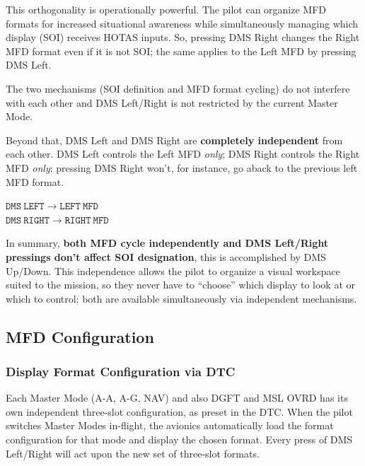 \documentclass[11pt, a4paper, twoside]{report}
\begin{document}
This orthogonality is operationally powerful. The pilot can organize MFD formats for increased situational awareness while simultaneously managing which display (SOI) receives HOTAS inputs. So, pressing DMS Right changes the Right MFD format even if it is not SOI; the same applies to the Left MFD by pressing DMS Left.

The two mechanisms (SOI definition and MFD format cycling) do not interfere with each other and DMS Left/Right is not restricted by the current Master Mode.

Beyond that, DMS Left and DMS Right are \textbf{completely independent} from each other. DMS Left controls the Left MFD \textit{only}; DMS Right controls the Right MFD \textit{only}: pressing DMS Right won't, for instance, go aback to the previous left MFD format.

\begin{center}
	$\mathtt{DMS\ LEFT} \longrightarrow \mathtt{LEFT\ MFD}$\\[1em]
	$\mathtt{DMS\ RIGHT} \longrightarrow \mathtt{RIGHT\ MFD}$
\end{center}

In summary, \textbf{both MFD cycle independently and DMS Left/Right pressings don't affect SOI designation}, this is accomplished by DMS Up/Down. This independence allows the pilot to organize a visual workspace suited to the mission, so they never have to ``choose'' which display to look at or which to control; both are available simultaneously via independent mechanisms.

\subsection{MFD Configuration}
\label{sec:C3-S4-S2}
\subsubsection{Display Format Configuration via DTC}
\label{sec:C3-S4-S2-S1}

Each Master Mode (A-A, A-G, NAV) and also DGFT and MSL OVRD has its own independent three-slot configuration, as preset in the DTC. When the pilot switches Master Modes in-flight, the avionics automatically load the format configuration for that mode and display the chosen format. Every press of DMS Left/Right will act upon the new set of three-slot formats.
\end{document}
